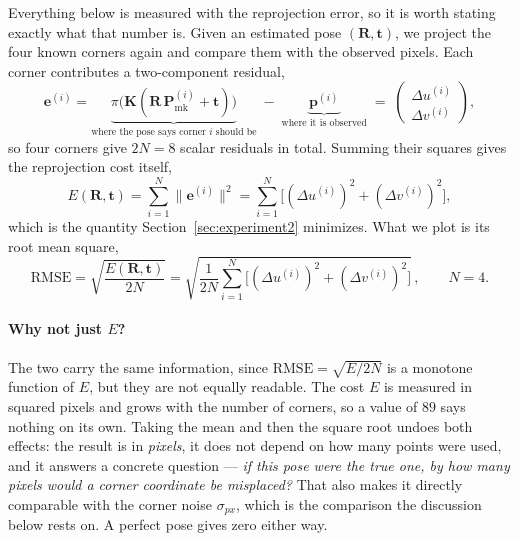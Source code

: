 \documentclass[11pt,a4paper]{article}
\theoremstyle{definition}
\theoremstyle{plain}
\theoremstyle{remark}
\newcommand{\Pmark}{\mathbf{P}_{\text{mk}}}
\newcommand{\KK}{\mathbf{K}}
\begin{document}
Everything below is measured with the reprojection error, so it is worth
stating exactly what that number is. Given an estimated pose
$(\mathbf{R},\mathbf{t})$, we project the four known corners again and compare
them with the observed pixels. Each corner contributes a two-component
residual,
\begin{equation}
  \mathbf{e}^{(i)}
  = \underbrace{\pi\!\big(\KK(\mathbf{R}\,\Pmark^{(i)} + \mathbf{t})\big)}
    _{\text{where the pose says corner } i \text{ should be}}
  \;-\;
  \underbrace{\mathbf{p}^{(i)}}_{\text{where it is observed}}
  \;=\;
  \begin{pmatrix} \Delta u^{(i)} \\ \Delta v^{(i)} \end{pmatrix},
  \label{eq:residual}
\end{equation}
so four corners give $2N = 8$ scalar residuals in total. Summing their squares
gives the reprojection cost itself,
\begin{equation}
  E(\mathbf{R},\mathbf{t}) = \sum_{i=1}^{N}\|\mathbf{e}^{(i)}\|^2
  = \sum_{i=1}^{N}\Big[(\Delta u^{(i)})^2+(\Delta v^{(i)})^2\Big],
  \label{eq:cost}
\end{equation}
which is the quantity Section~\ref{sec:experiment2} minimizes. What we plot is
its root mean square,
\begin{equation}
  \boxed{\quad
  \mathrm{RMSE}
  =\sqrt{\frac{E(\mathbf{R},\mathbf{t})}{2N}}
  =\sqrt{\frac{1}{2N}\sum_{i=1}^{N}
    \Big[(\Delta u^{(i)})^2+(\Delta v^{(i)})^2\Big]}\,,
  \qquad N = 4 .
  \quad}
  \label{eq:rmse}
\end{equation}

\paragraph{Why not just $E$?} The two carry the same information, since
$\mathrm{RMSE}=\sqrt{E/2N}$ is a monotone function of $E$, but they are not
equally readable. The cost $E$ is measured in squared pixels and grows with the
number of corners, so a value of $89$ says nothing on its own. Taking the mean
and then the square root undoes both effects: the result is in \emph{pixels},
it does not depend on how many points were used, and it answers a concrete
question --- \emph{if this pose were the true one, by how many pixels would a
corner coordinate be misplaced?} That also makes it directly comparable with
the corner noise $\sigma_{px}$, which is the comparison the discussion below
rests on. A perfect pose gives zero either way.
\end{document}
